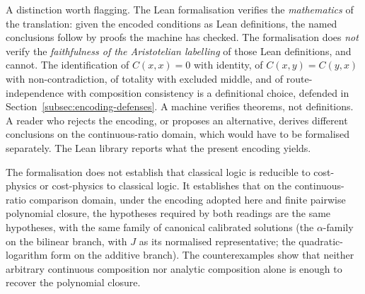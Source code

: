 \documentclass[11pt,a4paper]{article}
\theoremstyle{definition}
\theoremstyle{remark}
\begin{document}
A distinction worth flagging. The Lean formalisation verifies the
\emph{mathematics} of the translation: given the encoded conditions
as Lean definitions, the named conclusions follow by proofs the
machine has checked. The formalisation does \emph{not} verify the
\emph{faithfulness of the Aristotelian labelling} of those Lean
definitions, and cannot. The identification of $C(x, x) = 0$ with
identity, of $C(x, y) = C(y, x)$ with non-contradiction, of totality
with excluded middle, and of route-independence with composition
consistency is a definitional choice, defended in
Section~\ref{subsec:encoding-defenses}. A machine verifies theorems,
not definitions. A reader who rejects the encoding, or proposes an
alternative, derives different conclusions on the continuous-ratio
domain, which would have to be formalised separately. The Lean
library reports what the present encoding yields.

The formalisation does not establish that classical logic is
reducible to cost-physics or cost-physics to classical logic. It
establishes that on the continuous-ratio comparison domain, under
the encoding adopted here and finite pairwise polynomial closure, the
hypotheses required by both readings are the same hypotheses, with the
same family of canonical calibrated solutions (the $\alpha$-family on
the bilinear branch, with $J$ as its normalised representative; the
quadratic-logarithm form on the additive branch). The counterexamples
show that neither arbitrary continuous composition nor analytic
composition alone is enough to recover the polynomial closure.
\end{document}
